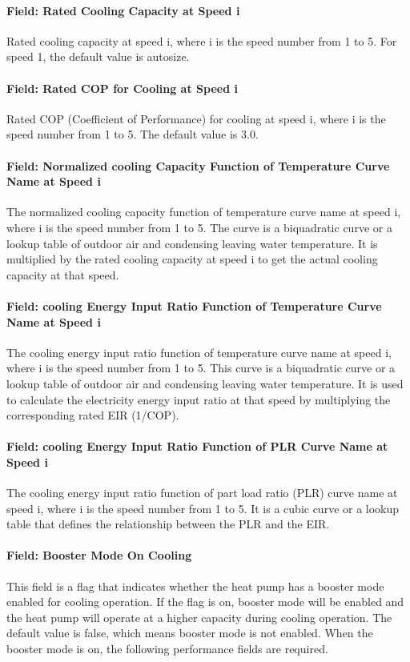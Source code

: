 \paragraph{Field: Rated Cooling Capacity at Speed i} Rated cooling capacity at
speed i, where i is the speed number from 1 to 5. For speed 1, the default value
is autosize.
\paragraph{Field: Rated COP for Cooling at Speed i} Rated COP (Coefficient of
Performance) for cooling at speed i, where i is the speed number from 1 to 5.
The default value is 3.0.
\paragraph{Field: Normalized cooling Capacity Function of Temperature Curve Name
at Speed i} The normalized cooling capacity function of temperature curve name
at speed i, where i is the speed number from 1 to 5. The curve is a biquadratic
curve or a lookup table of outdoor air and condensing leaving water temperature.
It is multiplied by the rated cooling capacity at speed i to get the actual
cooling capacity at that speed.
\paragraph{Field: cooling Energy Input Ratio Function of Temperature Curve Name
at Speed i} The cooling energy input ratio function of temperature curve name at
speed i, where i is the speed number from 1 to 5. This curve is a biquadratic
curve or a lookup table of outdoor air and condensing leaving water temperature.
It is used to calculate the electricity energy input ratio at that speed by
multiplying the corresponding rated EIR (1/COP).
\paragraph{Field: cooling Energy Input Ratio Function of PLR Curve Name at Speed
i} The cooling energy input ratio function of part load ratio (PLR) curve name
at speed i, where i is the speed number from 1 to 5. It is a cubic curve or a
lookup table that defines the relationship between the PLR and the EIR.
\paragraph{Field: Booster Mode On Cooling} This field is a flag that indicates
whether the heat pump has a booster mode enabled for cooling operation. If the
flag is on, booster mode will be enabled and the heat pump will operate at a
higher capacity during cooling operation. The default value is false, which
means booster mode is not enabled. When the booster mode is on, the following
performance fields are required.
